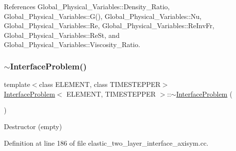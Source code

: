 References Global\+\_\+\+Physical\+\_\+\+Variables\+::\+Density\+\_\+\+Ratio, Global\+\_\+\+Physical\+\_\+\+Variables\+::\+G(), Global\+\_\+\+Physical\+\_\+\+Variables\+::\+Nu, Global\+\_\+\+Physical\+\_\+\+Variables\+::\+Re, Global\+\_\+\+Physical\+\_\+\+Variables\+::\+Re\+Inv\+Fr, Global\+\_\+\+Physical\+\_\+\+Variables\+::\+Re\+St, and Global\+\_\+\+Physical\+\_\+\+Variables\+::\+Viscosity\+\_\+\+Ratio.

\mbox{\label{classInterfaceProblem_a90c191f8046069099b199743e7ce7111}} 
\subsubsection{\texorpdfstring{$\sim$\+Interface\+Problem()}{~InterfaceProblem()}\hspace{0.1cm}{\footnotesize\ttfamily [1/2]}}
{\footnotesize\ttfamily template$<$class E\+L\+E\+M\+E\+NT, class T\+I\+M\+E\+S\+T\+E\+P\+P\+ER$>$ \\
\hyperlink{classInterfaceProblem}{Interface\+Problem}$<$ E\+L\+E\+M\+E\+NT, T\+I\+M\+E\+S\+T\+E\+P\+P\+ER $>$\+::$\sim$\hyperlink{classInterfaceProblem}{Interface\+Problem} (\begin{DoxyParamCaption}{ }\end{DoxyParamCaption})\hspace{0.3cm}{\ttfamily [inline]}}



Destructor (empty) 



Definition at line 186 of file elastic\+\_\+two\+\_\+layer\+\_\+interface\+\_\+axisym.\+cc.

\mbox{\label{classInterfaceProblem_ab476bae8faf34f3238b31564d31a4795}} 
